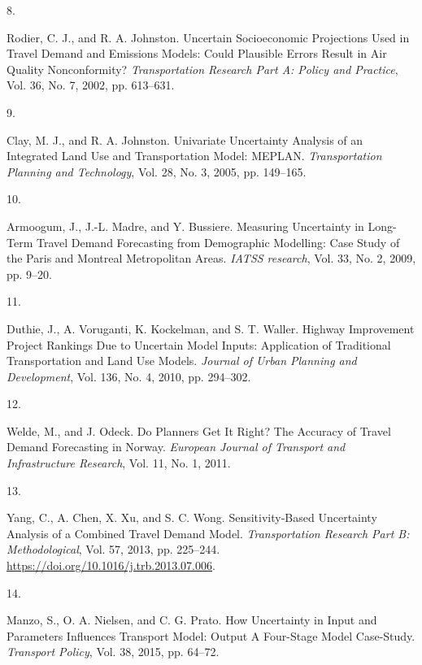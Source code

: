 \documentclass[
  letterpaper,
]{trb}
\newlength{\cslhangindent}
\newlength{\csllabelwidth}
\newlength{\cslentryspacingunit} %
\newenvironment{CSLReferences}[2] %
 {%
  \setlength{\parindent}{0pt}
  \ifodd #1
  \let\oldpar\par
  \def\par{\hangindent=\cslhangindent\oldpar}
  \fi
  \setlength{\parskip}{#2\cslentryspacingunit}
 }%
 {}
\newcommand{\CSLLeftMargin}[1]{\parbox[t]{\csllabelwidth}{#1}}
\newcommand{\CSLRightInline}[1]{\parbox[t]{\linewidth - \csllabelwidth}{#1}\break}
\begin{document}
\begin{CSLReferences}{0}{0}
\leavevmode{}%
\CSLLeftMargin{8. }%
\CSLRightInline{Rodier, C. J., and R. A. Johnston. Uncertain
Socioeconomic Projections Used in Travel Demand and Emissions Models:
Could Plausible Errors Result in Air Quality Nonconformity?
\emph{Transportation Research Part A: Policy and Practice}, Vol. 36, No.
7, 2002, pp. 613--631.}

\leavevmode{}%
\CSLLeftMargin{9. }%
\CSLRightInline{Clay, M. J., and R. A. Johnston. Univariate Uncertainty
Analysis of an Integrated Land Use and Transportation Model: {MEPLAN}.
\emph{Transportation Planning and Technology}, Vol. 28, No. 3, 2005, pp.
149--165.}

\leavevmode{}%
\CSLLeftMargin{10. }%
\CSLRightInline{Armoogum, J., J.-L. Madre, and Y. Bussiere. Measuring
Uncertainty in Long-Term Travel Demand Forecasting from Demographic
Modelling: {Case} Study of the {Paris} and {Montreal} Metropolitan
Areas. \emph{IATSS research}, Vol. 33, No. 2, 2009, pp. 9--20.}

\leavevmode{}%
\CSLLeftMargin{11. }%
\CSLRightInline{Duthie, J., A. Voruganti, K. Kockelman, and S. T.
Waller. Highway Improvement Project Rankings Due to Uncertain Model
Inputs: {Application} of Traditional Transportation and Land Use Models.
\emph{Journal of Urban Planning and Development}, Vol. 136, No. 4, 2010,
pp. 294--302.}

\leavevmode{}%
\CSLLeftMargin{12. }%
\CSLRightInline{Welde, M., and J. Odeck. Do Planners Get It Right? {The}
Accuracy of Travel Demand Forecasting in {Norway}. \emph{European
Journal of Transport and Infrastructure Research}, Vol. 11, No. 1,
2011.}

\leavevmode{}%
\CSLLeftMargin{13. }%
\CSLRightInline{Yang, C., A. Chen, X. Xu, and S. C. Wong.
Sensitivity-Based Uncertainty Analysis of a Combined Travel Demand
Model. \emph{Transportation Research Part B: Methodological}, Vol. 57,
2013, pp. 225--244. \url{https://doi.org/10.1016/j.trb.2013.07.006}.}

\leavevmode{}%
\CSLLeftMargin{14. }%
\CSLRightInline{Manzo, S., O. A. Nielsen, and C. G. Prato. How
Uncertainty in Input and Parameters Influences Transport Model: Output
{A} Four-Stage Model Case-Study. \emph{Transport Policy}, Vol. 38, 2015,
pp. 64--72.}


\end{CSLReferences}
\end{document}
